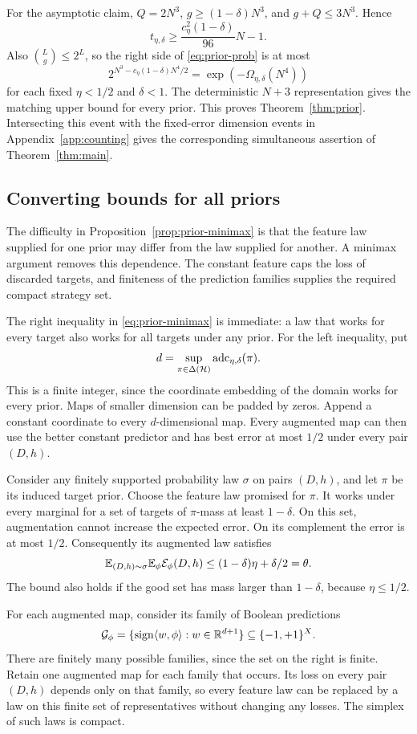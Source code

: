 For the asymptotic claim, $Q=2N^3$, $g\ge(1-\delta)N^3$, and $g+Q\le3N^3$. Hence
\[
 t_{\eta,\delta}\ge\frac{c_\eta^2(1-\delta)}{96}N-1.
\]
Also $\binom Lg\le2^L$, so the right side of \eqref{eq:prior-prob} is at most
\[
 2^{N^3-c_\eta(1-\delta)N^4/2}
 =\exp(-\Omega_{\eta,\delta}(N^4))
\]
for each fixed $\eta<1/2$ and $\delta<1$. The deterministic $N+3$ representation gives the matching upper bound for every prior. This proves Theorem~\ref{thm:prior}. Intersecting this event with the fixed-error dimension events in Appendix~\ref{app:counting} gives the corresponding simultaneous assertion of Theorem~\ref{thm:main}.

\subsection{Converting bounds for all priors}
The difficulty in Proposition~\ref{prop:prior-minimax} is that the feature law supplied for one prior may differ from the law supplied for another. A minimax argument removes this dependence. The constant feature caps the loss of discarded targets, and finiteness of the prediction families supplies the required compact strategy set.

The right inequality in \eqref{eq:prior-minimax} is immediate: a law that works for every target also works for all targets under any prior. For the left inequality, put
\[
 d=\sup_{\pi\in\Delta(\mathcal H)}\operatorname{adc}_{\eta,\delta}(\pi).
\]
This is a finite integer, since the coordinate embedding of the domain works for every prior. Maps of smaller dimension can be padded by zeros. Append a constant coordinate to every $d$-dimensional map. Every augmented map can then use the better constant predictor and has best error at most $1/2$ under every pair $(D,h)$.

Consider any finitely supported probability law $\sigma$ on pairs $(D,h)$, and let $\pi$ be its induced target prior. Choose the feature law promised for $\pi$. It works under every marginal for a set of targets of $\pi$-mass at least $1-\delta$. On this set, augmentation cannot increase the expected error. On its complement the error is at most $1/2$. Consequently its augmented law satisfies
\begin{equation}
 \mathbb E_{(D,h)\sim\sigma}\mathbb E_\phi\mathcal E_\phi(D,h)
 \le (1-\delta)\eta+\delta/2=\theta.
 \label{eq:prior-game}
\end{equation}
The bound also holds if the good set has mass larger than $1-\delta$, because $\eta\le1/2$.

For each augmented map, consider its family of Boolean predictions
\[
 \mathcal G_\phi=\{\operatorname{sign}\langle w,\phi\rangle:w\in\mathbb R^{d+1}\}\subseteq\{-1,+1\}^{X}.
\]
There are finitely many possible families, since the set on the right is finite. Retain one augmented map for each family that occurs. Its loss on every pair $(D,h)$ depends only on that family, so every feature law can be replaced by a law on this finite set of representatives without changing any losses. The simplex of such laws is compact.

